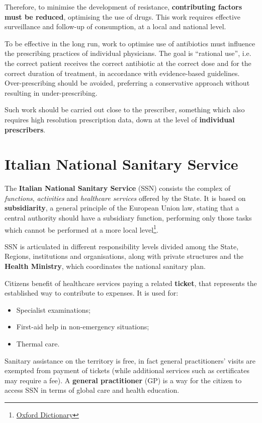 Therefore, to minimise the development of resistance, \textbf{contributing factors must be reduced}, optimising the use of drugs. This work requires effective surveillance and follow-up of consumption, at a local and national level. 

To be effective in the long run, work to optimise use of antibiotics must influence the prescribing practices of individual physicians. The goal is “rational use”, i.e. the correct patient receives the correct antibiotic at the correct dose and for the correct duration of treatment, in accordance with evidence-based guidelines. Over-prescribing should be avoided, preferring a conservative approach without resulting in under-prescribing\cite{sweden}.

Such work should be carried out close to the prescriber, something which also requires high resolution prescription data, down at the level of \textbf{individual prescribers}.

\section[SSN]{Italian National Sanitary Service}
The \textbf{Italian National Sanitary Service} (SSN) consists the complex of \textit{functions}, \textit{activities} and \textit{healthcare services} offered by the State. It is based on \textbf{subsidiarity}, a general principle of the European Union law, stating that a central authority should have a subsidiary function, performing only those tasks which cannot be performed at a more local level\footnote{\href{https://en.oxforddictionaries.com/definition/subsidiarity}{Oxford Dictionary}}.

SSN is articulated in different responsibility levels divided among the State, Regions, institutions and organisations, along with private structures and the \textbf{Health Ministry}, which coordinates the national sanitary plan.

Citizens benefit of healthcare services paying a related \textbf{ticket}\cite{ticket}, that represents the established way to contribute to expenses. It is used for:
\begin{itemize}
	\item Specialist examinations;
	\item First-aid help in non-emergency situations;
	\item Thermal care.
\end{itemize}

Sanitary assistance on the territory is free, in fact general practitioners' visits are exempted from payment of tickets (while additional services such as certificates may require a fee). A \textbf{general practitioner} (GP) is a way for the citizen to access SSN in terms of global care and health education.


